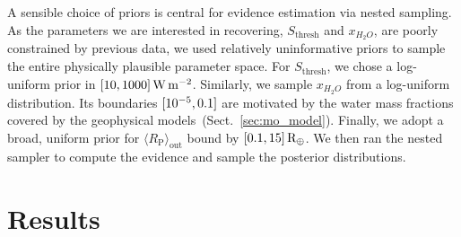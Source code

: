 \documentclass[modern]{aastex631}
\begin{document}
A sensible choice of priors is central for evidence estimation via nested sampling.
As the parameters we are interested in recovering, $S_\mathrm{thresh}$ and $x_{H_2O}$, are poorly constrained by previous data, we used relatively uninformative priors to sample the entire physically plausible parameter space.
For $S_\mathrm{thresh}$, we chose a log-uniform prior in $[10,1000]\, \SI{}{\watt\per\meter\squared}$.
Similarly, we sample $x_{H_2O}$ from a log-uniform distribution.
Its boundaries $[10^{-5}, 0.1]$ are motivated by the water mass fractions covered by the geophysical models~(Sect.~\ref{sec:mo_model}).
Finally, we adopt a broad, uniform prior for $\langle R_\mathrm{P}\rangle_\mathrm{out}$ bound by $[0.1, 15] \, \mathrm{R_\oplus}$.
We then ran the nested sampler to compute the evidence and sample the posterior distributions.



\section{Results}
\end{document}
